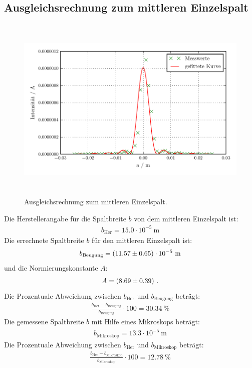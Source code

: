 \subsection{Ausgleichsrechnung zum mittleren Einzelspalt}
\begin{figure}[H] %
  \centering
  \includegraphics[height=9cm]{build/plot2.pdf}
  \caption{Ausgleichsrechnung zum mittleren Einzelspalt.}
  \label{fig:Einzel2}
\end{figure}

Die Herstellerangabe für die Spaltbreite $b$ von dem mittleren Einzelspalt ist:
\begin{align*}
  b_\text{Her} = 15.0 \cdot 10^{-5} \ \text{m}
\end{align*}
Die errechnete Spaltbreite $b$ für den mittleren Einzelspalt ist:
\begin{align*}
  b_\text{Beugung} = (\num{11.57 +- 0.65}) \cdot 10^{-5} \ \text{m}
\end{align*}
und die Normierungskonstante $A$:
\begin{align*}
  A = (\num{8.69 +- 0.39}) \ .
\end{align*}
Die Prozentuale Abweichung zwischen $b_\text{Her}$ und $b_\text{Beugung}$ beträgt:
\begin{align*}
  \frac{b_\text{Her}-b_\text{Beugung}}{b_\text{Beugung}} \cdot 100 = 30.34 \ \%
\end{align*}
Die gemessene Spaltbreite $b$ mit Hilfe eines Mikroskops beträgt:
\begin{align*}
  b_\text{Mikroskop} = 13.3 \cdot 10^{-5} \ \text{m}
\end{align*}
Die Prozentuale Abweichung zwischen $b_\text{Her}$ und $b_\text{Mikroskop}$ beträgt:
\begin{align*}
  \frac{b_\text{Her}-b_\text{Mikroskop}}{b_\text{Mikroskop}} \cdot 100 = 12.78 \ \%
\end{align*}


